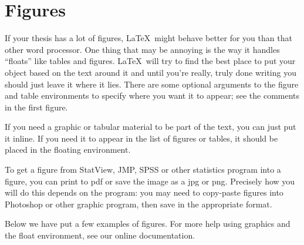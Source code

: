 \documentclass[12pt,twoside]{reedthesis}
\begin{document}
%
%
%   
   \section{Figures}
   
	If your thesis has a lot of figures, \LaTeX\ might behave better for you than that other word processor.  One thing that may be annoying is the way it handles ``floats'' like tables and figures. \LaTeX\ will try to find the best place to put your object based on the text around it and until you're really, truly done writing you should just leave it where it lies.   There are some optional arguments to the figure and table environments to specify where you want it to appear; see the comments in the first figure.

	If you need a graphic or tabular material to be part of the text, you can just put it inline. If you need it to appear in the list of figures or tables, it should be placed in the floating environment. 
	
	To get a figure from StatView, JMP, SPSS or other statistics program into a figure, you can print to pdf or save the image as a jpg or png. Precisely how you will do this depends on the program: you may need to copy-paste figures into Photoshop or other graphic program, then save in the appropriate format.
	
	Below we have put a few examples of figures. For more help using graphics and the float environment, see our online documentation.
	
\end{document}
